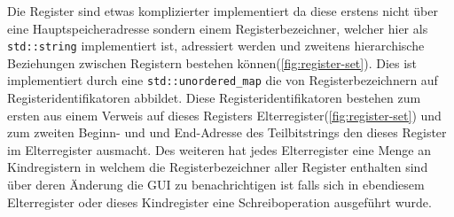 Die Register sind etwas komplizierter implementiert da diese erstens nicht über
eine Hauptspeicheradresse sondern einem Registerbezeichner, welcher hier als
\texttt{std::string} implementiert ist, adressiert werden und zweitens
hierarchische Beziehungen zwischen Registern bestehen
können(\autoref{fig:register-set}). Dies ist implementiert durch eine
\texttt{std::unordered\_map} die von  Registerbezeichnern auf
Registeridentifikatoren abbildet. Diese Registeridentifikatoren bestehen zum
ersten aus einem Verweis auf dieses Registers
Elterregister(\autoref{fig:register-set}) und zum zweiten Beginn- und und
End-Adresse des Teilbitstrings den dieses Register im Elterregister ausmacht.
Des weiteren hat jedes Elterregister eine Menge an Kindregistern in welchem die
Registerbezeichner aller Register enthalten sind über deren Änderung die GUI zu
benachrichtigen ist falls sich in ebendiesem Elterregister oder dieses
Kindregister eine Schreiboperation ausgeführt wurde.

